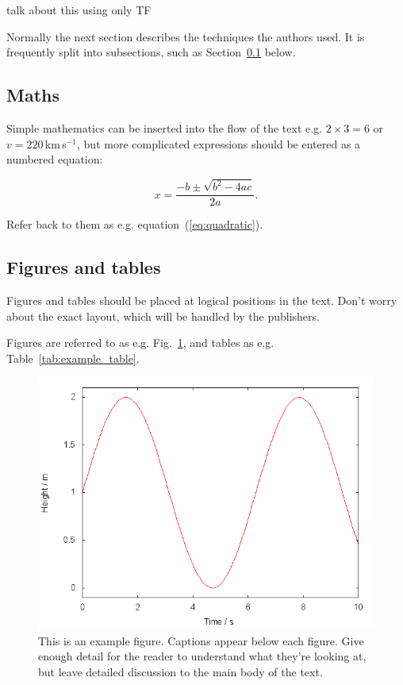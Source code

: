 \documentclass[a4paper,fleqn,usenatbib]{mnras}
\begin{document}
talk about this using only TF

Normally the next section describes the techniques the authors used.
It is frequently split into subsections, such as Section~\ref{sec:maths} below.

\subsection{Maths}
\label{sec:maths} %

Simple mathematics can be inserted into the flow of the text e.g. $2\times3=6$
or $v=220$\,km\,s$^{-1}$, but more complicated expressions should be entered
as a numbered equation:

\begin{equation}
    x=\frac{-b\pm\sqrt{b^2-4ac}}{2a}.
	\label{eq:quadratic}
\end{equation}

Refer back to them as e.g. equation~(\ref{eq:quadratic}).

\subsection{Figures and tables}

Figures and tables should be placed at logical positions in the text. Don't
worry about the exact layout, which will be handled by the publishers.

Figures are referred to as e.g. Fig.~\ref{fig:example_figure}, and tables as
e.g. Table~\ref{tab:example_table}.

\begin{figure}
	\includegraphics[width=\columnwidth]{example}
    \caption{This is an example figure. Captions appear below each figure.
	Give enough detail for the reader to understand what they're looking at,
	but leave detailed discussion to the main body of the text.}
    \label{fig:example_figure}
\end{figure}
\end{document}
